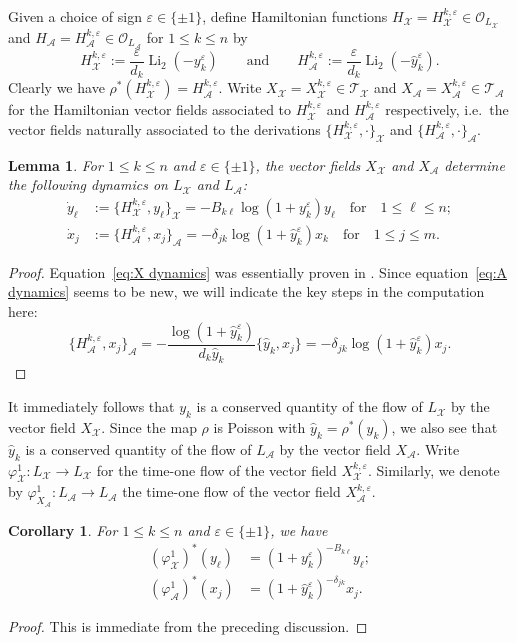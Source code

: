 \documentclass{amsart}
\newtheorem{corollary}[theorem]{Corollary}
\newtheorem{lemma}[theorem]{Lemma}
\numberwithin{equation}{section}
\newcommand{\cA}{\mathcal{A}}
\newcommand{\cO}{\mathcal{O}}
\newcommand{\cX}{\mathcal{X}}
\newcommand{\cT}{\mathcal{T}}
\newcommand{\Li}{\operatorname{Li}}
\begin{document}
Given a choice of sign $\varepsilon\in\{\pm1\}$, define Hamiltonian functions $H_\cX=H^{k,\varepsilon}_\cX\in\cO_{L_\cX}$ and $H_\cA=H^{k,\varepsilon}_\cA\in\cO_{L_\cA}$ for $1\le k\le n$ by
\begin{equation}
  \label{eq:hamiltonians}
  H_\cX^{k,\varepsilon}:=\frac{\varepsilon}{d_k}\Li_2(-y_k^\varepsilon)\qquad\text{and}\qquad H_\cA^{k,\varepsilon}:=\frac{\varepsilon}{d_k}\Li_2(-\hat y_k^\varepsilon).
\end{equation}
Clearly we have $\rho^*(H_\cX^{k,\varepsilon})=H_\cA^{k,\varepsilon}$.
Write $X_\cX=X_\cX^{k,\varepsilon}\in\cT_\cX$ and $X_\cA=X_\cA^{k,\varepsilon}\in\cT_\cA$ for the Hamiltonian vector fields associated to $H_\cX^{k,\varepsilon}$ and $H_\cA^{k,\varepsilon}$ respectively, i.e.\ the vector fields naturally associated to the derivations $\{H_\cX^{k,\varepsilon},\cdot\}_\cX$ and $\{H_\cA^{k,\varepsilon},\cdot\}_\cA$.
\begin{lemma}
  \label{le:hamiltonian dynamics}
  For $1\le k\le n$ and $\varepsilon\in\{\pm1\}$, the vector fields $X_\cX$ and $X_\cA$ determine the following dynamics on $L_\cX$ and $L_\cA$:
  \begin{align}
    \label{eq:X dynamics}
    \dot y_\ell&:=\{H_\cX^{k,\varepsilon},y_\ell\}_\cX=-B_{k\ell}\log(1+y_k^\varepsilon)y_\ell\quad\text{for}\quad 1\le\ell\le n;\\
    \label{eq:A dynamics}
    \dot x_j&:=\{H_\cA^{k,\varepsilon},x_j\}_\cA=-\delta_{jk}\log(1+\hat y_k^\varepsilon)x_k\quad\text{for}\quad 1\le j\le m.
  \end{align}
\end{lemma}
\begin{proof}
  Equation~\eqref{eq:X dynamics} was essentially proven in \cite{MR3691969}.
  Since equation~\eqref{eq:A dynamics} seems to be new, we will indicate the key steps in the computation here:
  \[\{H_\cA^{k,\varepsilon},x_j\}_\cA=-\frac{\log(1+\hat y_k^\varepsilon)}{d_k\hat y_k}\{\hat y_k,x_j\}=-\delta_{jk}\log(1+\hat y_k^\varepsilon)x_j.\]
\end{proof}

It immediately follows that $y_k$ is a conserved quantity of the flow of $L_\cX$ by the vector field $X_\cX$.
Since the map $\rho$ is Poisson with $\hat y_k=\rho^*(y_k)$, we also see that $\hat y_k$ is a conserved quantity of the flow of $L_\cA$ by the vector field $X_\cA$.
Write $\varphi_\cX^1:L_\cX\to L_\cX$ for the time-one flow of the vector field $X_\cX^{k,\varepsilon}$.
Similarly, we denote by $\varphi_{X_\cA}^1:L_\cA\to L_\cA$ the time-one flow of the vector field $X_\cA^{k,\varepsilon}$.
\begin{corollary}
  \label{cor:time-one flows}
  For $1\le k\le n$ and $\varepsilon\in\{\pm1\}$, we have
  \begin{align*}
    (\varphi_\cX^1)^*(y_\ell)&=(1+y_k^\varepsilon)^{-B_{k\ell}}y_\ell;\\
    (\varphi_\cA^1)^*(x_j)&=(1+\hat y_k^\varepsilon)^{-\delta_{jk}}x_j.
  \end{align*}
\end{corollary}
\begin{proof}
  This is immediate from the preceding discussion.
\end{proof}
\end{document}
